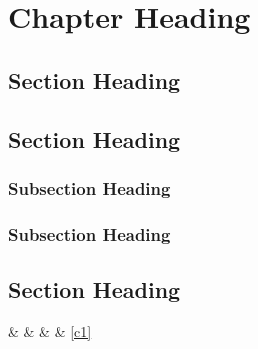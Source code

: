 \chapter{Chapter Heading}
\section{Section Heading}
\section{Section Heading}
\subsection{Subsection Heading}
\subsection{Subsection Heading}
\section{Section Heading}



 \&  \&   \& \pageref{c1} \& \ref{c1} 




